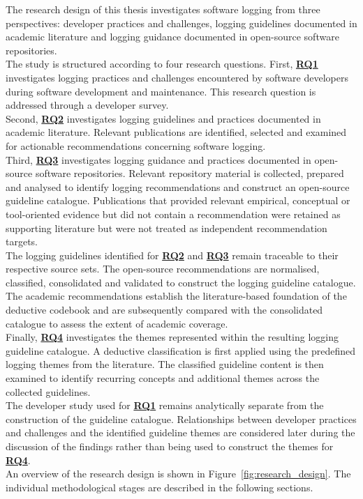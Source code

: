 The research design of this thesis investigates software logging from three
perspectives: developer practices and challenges, logging guidelines
documented in academic literature and logging guidance documented in open-source
software repositories.
\\
The study is structured according to four research questions. First,
\hyperref[table:t1rq]{\textbf{RQ1}} investigates logging practices and challenges
encountered by software developers during software development and maintenance.
This research question is addressed through a developer survey.
\\
Second, \hyperref[table:t1rq]{\textbf{RQ2}} investigates logging guidelines and practices documented
in academic literature. Relevant publications are identified, selected and examined
for actionable recommendations concerning software logging.
\\
Third, \hyperref[table:t1rq]{\textbf{RQ3}} investigates logging guidance and practices documented
in open-source software repositories. Relevant repository material is collected,
prepared and analysed to identify logging recommendations and construct an
open-source guideline catalogue.
Publications that provided relevant empirical, conceptual or tool-oriented evidence 
but did not contain a recommendation were retained as supporting 
literature but were not treated as independent recommendation targets.
\\
The logging guidelines identified for \hyperref[table:t1rq]{\textbf{RQ2}} and
\hyperref[table:t1rq]{\textbf{RQ3}} remain traceable to their respective source sets.
The open-source recommendations are normalised, classified, consolidated and validated
to construct the logging guideline catalogue.
The academic recommendations establish the literature-based foundation of the
deductive codebook and are subsequently compared with the consolidated catalogue
to assess the extent of academic coverage.
\\
Finally, \hyperref[table:t1rq]{\textbf{RQ4}} investigates the themes represented
within the resulting logging guideline catalogue.
A deductive classification is first applied using the predefined logging
themes from the literature. The classified guideline content is then examined to identify
recurring concepts and additional themes across the collected guidelines.
\\
The developer study used for \hyperref[table:t1rq]{\textbf{RQ1}} remains analytically separate from the
construction of the guideline catalogue. Relationships between developer
practices and challenges and the identified guideline themes are considered later
during the discussion of the findings rather than being used to construct the themes
for \hyperref[table:t1rq]{\textbf{RQ4}}.
\\
An overview of the research design is shown in
Figure~\ref{fig:research_design}. The individual methodological stages are described
in the following sections.

